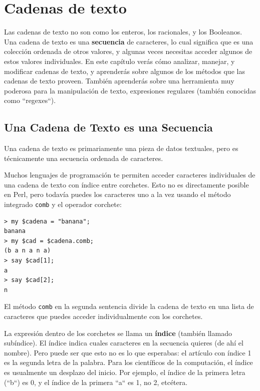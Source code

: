 
\chapter{Cadenas de texto}
\label{strings}

Las cadenas de texto no son como los enteros, los racionales,
y los Booleanos. Una cadena de texto es una {\bf secuencia} de caracteres,
lo cual significa que es una colección ordenada de otros valores,
y algunas veces necesitas acceder algunos de estos valores individuales.
En este capítulo verás cómo analizar, manejar, y modificar cadenas
de texto, y aprenderás sobre algunos de los métodos que las
cadenas de texto proveen. También aprenderás sobre una
herramienta muy poderosa para la manipulación de texto, 
expresiones regulares (también conocidas como ``regexes``).


\section{Una Cadena de Texto es una Secuencia}

Una cadena de texto es primariamente una pieza de datos textuales,
pero es técnicamente una secuencia ordenada de caracteres.

Muchos lenguajes de programación te permiten acceder caracteres
individuales de una cadena de texto con índice entre corchetes. 
Esto no es directamente posible en Perl, pero todavía puedes
los caracteres uno a la vez usando el método integrado {\tt comb} 
y el operador corchete:

\begin{verbatim}
> my $cadena = "banana";
banana
> my $cad = $cadena.comb;
(b a n a n a)
> say $cad[1];
a
> say $cad[2];
n
\end{verbatim}
%
El método {\tt comb} en la segunda sentencia divide la cadena de texto
en una lista de caracteres que puedes acceder individualmente con
los corchetes.

La expresión dentro de los corchetes se llama un {\bf índice}
(también llamado subíndice). El índice indica cuales 
caracteres en la secuencia quieres (de ahí el nombre). Pero
puede ser que esto no es lo que esperabas: el artículo con
índice 1 es la segunda letra de la palabra. Para los
científicos de la computación, el índice es usualmente
un desplazo del inicio. Por ejemplo, el índice de la primera 
letra (``b``) es 0, y el índice de la primera ``a`` es 1,
no 2, etcétera.

